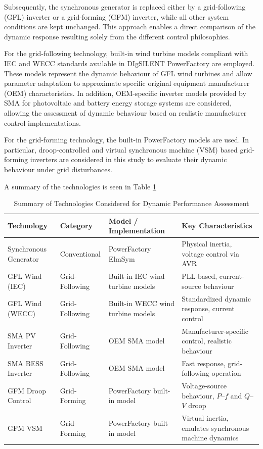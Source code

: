 Subsequently, the synchronous generator is replaced either by a grid-following (GFL) inverter or a grid-forming (GFM) inverter, while all other system conditions are kept unchanged. This approach enables a direct comparison of the dynamic response resulting solely from the different control philosophies.

For the grid-following technology, built-in wind turbine models compliant with IEC and WECC standards available in DIgSILENT PowerFactory are employed. These models represent the dynamic behaviour of GFL wind turbines and allow parameter adaptation to approximate specific original equipment manufacturer (OEM) characteristics. In addition, OEM-specific inverter models provided by SMA for photovoltaic and battery energy storage systems are considered, allowing the assessment of dynamic behaviour based on realistic manufacturer control implementations.

For the grid-forming technology, the built-in PowerFactory models are used. In particular, droop-controlled and virtual synchronous machine (VSM) based grid-forming inverters are considered in this study to evaluate their dynamic behaviour under grid disturbances. 

A summary of the technologies is seen in Table \ref{tab:technologies_summary}

\begin{table}[htbp!]
    \centering
    \caption{Summary of Technologies Considered for Dynamic Performance Assessment}
    \label{tab:technologies_summary}
    \begin{tabularx}{\textwidth}{l l l X}
    \toprule
    \textbf{Technology} & \textbf{Category} & \textbf{Model / Implementation} & \textbf{Key Characteristics} \\
    \midrule
    Synchronous Generator & Conventional & PowerFactory ElmSym & Physical inertia, voltage control via AVR \\
    GFL Wind (IEC) & Grid-Following & Built-in IEC wind turbine models & PLL-based, current-source behaviour \\
    GFL Wind (WECC) & Grid-Following & Built-in WECC wind turbine models & Standardized dynamic response, current control \\
    SMA PV Inverter & Grid-Following & OEM SMA model & Manufacturer-specific control, realistic behaviour \\
    SMA BESS Inverter & Grid-Following & OEM SMA model & Fast response, grid-following operation \\
    GFM Droop Control & Grid-Forming & PowerFactory built-in model & Voltage-source behaviour, $P$--$f$ and $Q$--$V$ droop \\
    GFM VSM & Grid-Forming & PowerFactory built-in model & Virtual inertia, emulates synchronous machine dynamics \\
    \bottomrule
    \end{tabularx}
    \end{table}



